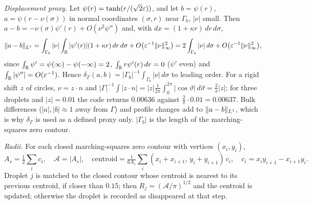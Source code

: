 \emph{Displacement proxy.} Let $\psi(r)=\tanh(r/(\sqrt2\varepsilon))$, and let $b=\psi(r)$, $a=\psi(r-\nu(\sigma))$ in normal coordinates $(\sigma,r)$ near $\Gamma_b$, $|\nu|$ small. Then $a-b=-\nu(\sigma)\psi'(r)+O(\nu^2\psi'')$ and, with $dx=(1+\kappa r)\,dr\,d\sigma$,
\[
\lVert a-b\rVert_{L^1}=\int_{\Gamma_b}|\nu|\int_{\mathbb{R}}|\psi'(r)|(1+\kappa r)\,dr\,d\sigma+O\big(\varepsilon^{-1}\lVert \nu\rVert_\infty^2\big)=2\int_{\Gamma_b}|\nu|\,d\sigma+O\big(\varepsilon^{-1}\lVert \nu\rVert_\infty^2\big),
\]
since $\int_{\mathbb{R}}\psi'=\psi(\infty)-\psi(-\infty)=2$, $\int_{\mathbb{R}} r\psi'(r)\,dr=0$ ($\psi'$ even) and $\int_{\mathbb{R}}|\psi''|=O(\varepsilon^{-1})$. Hence $\delta_\Gamma(a,b)=|\Gamma_b|^{-1}\int_{\Gamma_b}|\nu|\,d\sigma$ to leading order. For a rigid shift $z$ of circles, $\nu=z\cdot n$ and $|\Gamma|^{-1}\int|z\cdot n|=|z|\frac1{2\pi}\int_0^{2\pi}|\cos\vartheta|\,d\vartheta=\frac2\pi|z|$; for three droplets and $|z|=0.01$ the code returns $0.00636$ against $\frac2\pi\cdot0.01=0.00637$. Bulk differences ($|a|,|b|\approx1$ away from $\Gamma$) and profile changes add to $\lVert a-b\rVert_{L^1}$, which is why $\delta_\Gamma$ is used as a defined proxy only. $|\Gamma_b|$ is the length of the marching-squares zero contour.

\emph{Radii.} For each closed marching-squares zero contour with vertices $(x_i,y_i)$, \[
A_s=\tfrac12\sum_ic_i,\quad \mathcal A=|A_s|,\quad \text{centroid}=\tfrac1{6A_s}\sum_i(x_i+x_{i+1},\,y_i+y_{i+1})\,c_i,\quad c_i=x_iy_{i+1}-x_{i+1}y_i.
\] Droplet $j$ is matched to the closed contour whose centroid is nearest to its previous centroid, if closer than $0.15$; then $R_j=(\mathcal A/\pi)^{1/2}$ and the centroid is updated; otherwise the droplet is recorded as disappeared at that step.
